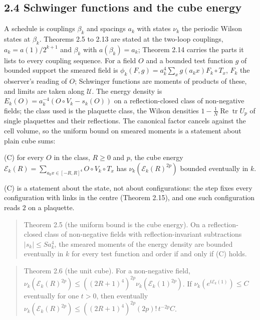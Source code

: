 \documentclass[10pt,letterpaper,twocolumn]{article}
\begin{document}
\subsection{2.4 Schwinger functions and the cube energy}\label{24-schwinger-functions-and-the-cube-energy}

A schedule is couplings \(\beta_k\) and spacings \(a_k\) with states \(\nu_k\) the periodic Wilson states at \(\beta_k\). Theorems 2.5 to 2.13 are stated at the two-loop couplings, \(a_k=a(1)/2^{k+1}\) and \(\beta_k\) with \(a(\beta_k)=a_k\); Theorem 2.14 carries the parts it lists to every coupling sequence. For a field \(O\) and a bounded test function \(g\) of bounded support the smeared field is \(\phi_k(F,g)=a_k^4\sum_xg(a_kx)F_k\circ T_x\), \(F_k\) the observer's reading of \(O\); Schwinger functions are moments of products of these, and limits are taken along \(\mathcal U\). The energy density is \(E_k(O)=a_k^{-4}(O\circ V_k-s_k(O))\) on a reflection-closed class of non-negative fields; the class used is the plaquette class, the Wilson densities \(1-\tfrac1N\operatorname{Re}\operatorname{tr}U_p\) of single plaquettes and their reflections. The canonical factor cancels against the cell volume, so the uniform bound on smeared moments is a statement about plain cube sums:

(C) for every \(O\) in the class, \(R\ge0\) and \(p\), the cube energy \(\mathcal E_k(R)=\sum_{a_kx\in[-R,R]^4}O\circ V_k\circ T_x\) has \(\nu_k(\mathcal E_k(R)^{2p})\) bounded eventually in \(k\).

(C) is a statement about the state, not about configurations: the step fixes every configuration with links in the centre (Theorem 2.15), and one such configuration reads \(2\) on a plaquette.

\begin{quote}
Theorem 2.5 (the uniform bound is the cube energy). On a reflection-closed class of non-negative fields with reflection-invariant subtractions \(|s_k|\le Sa_k^4\), the smeared moments of the energy density are bounded eventually in \(k\) for every test function and order if and only if (C) holds.
\end{quote}

\begin{quote}
Theorem 2.6 (the unit cube). For a non-negative field, \(\nu_k(\mathcal E_k(R)^{2p})\le((2R+1)^4)^{2p}\nu_k(\mathcal E_k(1)^{2p})\). If \(\nu_k(e^{t\mathcal E_k(1)})\le C\) eventually for one \(t>0\), then eventually \(\nu_k(\mathcal E_k(R)^{2p})\le((2R+1)^4)^{2p}(2p)!\,t^{-2p}C\).
\end{quote}
\end{document}
